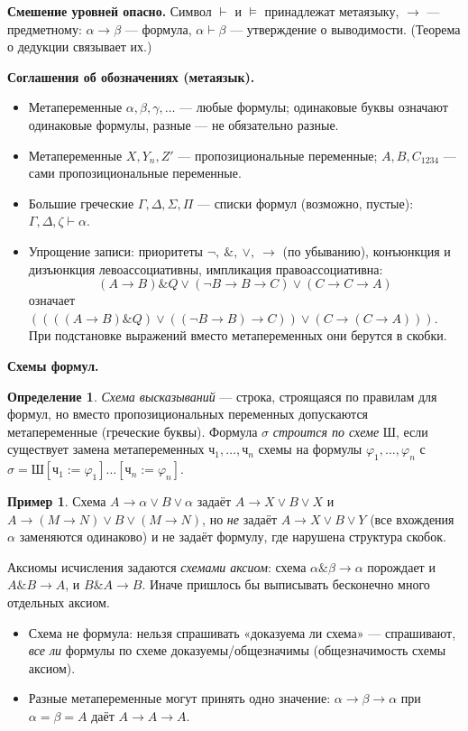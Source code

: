 \documentclass[11pt,a4paper]{article}
\newcommand{\amp}{\mathbin{\&}}
\newcommand{\vd}{\vdash}
\theoremstyle{definition}
\newtheorem*{dfn}{Определение}
\newtheorem*{exm}{Пример}
\begin{document}
\textbf{Смешение уровней опасно.} Символ $\vd$ и $\models$ принадлежат метаязыку, $\to$ --- предметному:
$\alpha\to\beta$ --- формула, $\alpha\vd\beta$ --- утверждение о выводимости. (Теорема о дедукции связывает их.)

\textbf{Соглашения об обозначениях (метаязык).}
\begin{itemize}
\item Метапеременные $\alpha,\beta,\gamma,\dots$ --- любые формулы; одинаковые буквы означают одинаковые формулы, разные --- не обязательно разные.
\item Метапеременные $X,Y_n,Z'$ --- пропозициональные переменные; $A,B,C_{1234}$ --- сами пропозициональные переменные.
\item Большие греческие $\Gamma,\Delta,\Sigma,\Pi$ --- списки формул (возможно, пустые): $\Gamma,\Delta,\zeta\vd\alpha$.
\item Упрощение записи: приоритеты $\neg,\ \amp,\ \vee,\ \to$ (по убыванию), конъюнкция и дизъюнкция левоассоциативны,
  импликация правоассоциативна:
  \[
  (A\to B)\amp Q\vee(\neg B\to B\to C)\vee(C\to C\to A)
  \]
  означает $((((A\to B)\amp Q)\vee((\neg B\to B)\to C))\vee(C\to(C\to A)))$.
  При подстановке выражений вместо метапеременных они берутся в скобки.
\end{itemize}

\textbf{Схемы формул.}
\begin{dfn}
\emph{Схема высказываний} --- строка, строящаяся по правилам для формул, но вместо
пропозициональных переменных допускаются метапеременные (греческие буквы).
Формула $\sigma$ \emph{строится по схеме} $\textit{Ш}$, если существует замена метапеременных
$\textit{ч}_1,\dots,\textit{ч}_n$ схемы на формулы $\varphi_1,\dots,\varphi_n$ с
$\sigma=\textit{Ш}[\textit{ч}_1:=\varphi_1]\dots[\textit{ч}_n:=\varphi_n]$.
\end{dfn}
\begin{exm}
Схема $A\to\alpha\vee B\vee\alpha$ задаёт $A\to X\vee B\vee X$ и $A\to(M\to N)\vee B\vee(M\to N)$, но
\emph{не} задаёт $A\to X\vee B\vee Y$ (все вхождения $\alpha$ заменяются одинаково) и не задаёт
формулу, где нарушена структура скобок.
\end{exm}
Аксиомы исчисления задаются \emph{схемами аксиом}: схема $\alpha\amp\beta\to\alpha$ порождает и $A\amp B\to A$, и $B\amp A\to B$.
Иначе пришлось бы выписывать бесконечно много отдельных аксиом.

\begin{warn}
\begin{itemize}
\item Схема не формула: нельзя спрашивать «доказуема ли схема» --- спрашивают, \emph{все ли} формулы по схеме доказуемы/общезначимы (общезначимость схемы аксиом).
\item Разные метапеременные могут принять одно значение: $\alpha\to\beta\to\alpha$ при $\alpha=\beta=A$ даёт $A\to A\to A$.
\end{itemize}
\end{warn}
\end{document}
